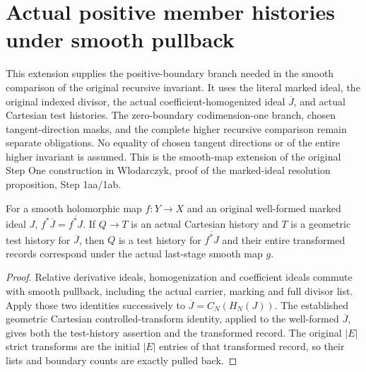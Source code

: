 \section{Actual positive member histories under smooth pullback}
\label{hir:smooth-positive-member-history-section}
This extension supplies the positive-boundary branch needed in the smooth
comparison of the original recursive invariant. It uses the literal marked
ideal, the original indexed divisor, the actual coefficient-homogenized ideal
$\overline J$, and actual Cartesian test histories. The zero-boundary
codimension-one branch, chosen tangent-direction masks, and the complete
higher recursive comparison remain separate obligations. No equality of
chosen tangent directions or of the entire higher invariant is assumed. This is the smooth-map extension of the
original Step One construction in Wlodarczyk,
proof of the marked-ideal resolution proposition, Step 1aa/1ab.

\begin{lemma}
\label{hir:smooth-bar-record}
\leanok
For a smooth holomorphic map $f:Y\to X$ and an original well-formed marked
ideal $J$, $f^*\overline J=\overline{f^*J}$. If $Q\to T$ is an actual
Cartesian history and $T$ is a geometric test history for $\overline J$,
then $Q$ is a test history for $\overline{f^*J}$ and their entire transformed
records correspond under the actual last-stage smooth map $g$.
\end{lemma}
\begin{proof}
Relative derivative ideals, homogenization and coefficient ideals commute
with smooth pullback, including the actual carrier, marking and full divisor
list. Apply those two identities successively to $\overline J=C_N(H_N(J))$.
The established geometric Cartesian controlled-transform identity, applied
to the well-formed $\overline J$, gives both the test-history assertion and
the transformed record. The original $|E|$ strict transforms are the initial
$|E|$ entries of that transformed record, so their lists and boundary counts
are exactly pulled back.
\end{proof}

